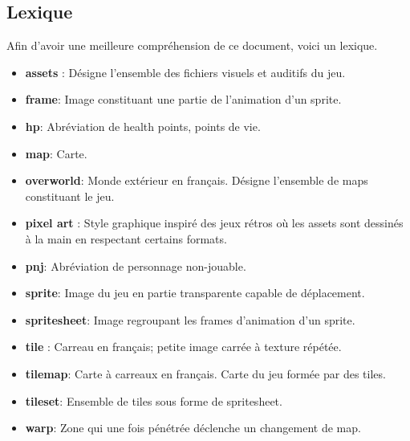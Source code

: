 \documentclass[11pt]{article}
\begin{document}
\subsection{Lexique}
Afin d'avoir une meilleure compréhension de ce document, voici un lexique. \\
\begin{itemize}{}{}
\item \textbf{assets} : Désigne l'ensemble des fichiers visuels et auditifs du jeu.
\item \textbf{frame}: Image constituant une partie de l'animation d'un sprite.
\item \textbf{hp}: Abréviation de health points, points de vie.
\item \textbf{map}: Carte.
\item \textbf{overworld}: Monde extérieur en français. Désigne l'ensemble de maps constituant le jeu.
\item \textbf{pixel art} : Style graphique inspiré des jeux rétros où les assets sont dessinés à la main en respectant certains formats.
\item \textbf{pnj}: Abréviation de personnage non-jouable.
\item \textbf{sprite}: Image du jeu en partie transparente capable de déplacement.
\item \textbf{spritesheet}: Image regroupant les frames d'animation d'un sprite.
\item \textbf{tile} : Carreau en français; petite image carrée à texture répétée.
\item \textbf{tilemap}: Carte à carreaux en français. Carte du jeu formée par des tiles.
\item \textbf{tileset}: Ensemble de tiles sous forme de spritesheet.
\item \textbf{warp}: Zone qui une fois pénétrée déclenche un changement de map.
\end{itemize}
\end{document}
